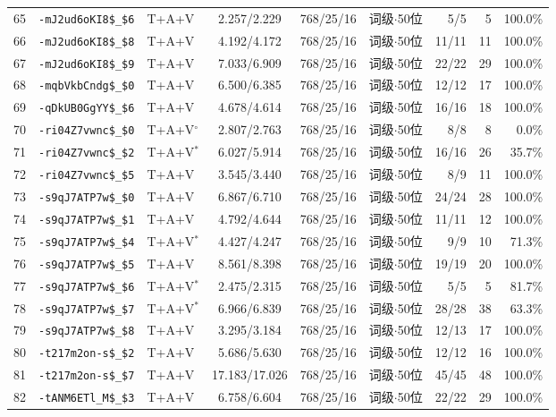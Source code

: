 \begin{longtable}{rllcccrrr}
65 & \texttt{-mJ2ud6oKI8\$\_\$6} & T+A+V & 2.257/2.229 & 768/25/16 & 词级$\cdot$50位 & 5/5 & 5 & 100.0\% \\
66 & \texttt{-mJ2ud6oKI8\$\_\$8} & T+A+V & 4.192/4.172 & 768/25/16 & 词级$\cdot$50位 & 11/11 & 11 & 100.0\% \\
67 & \texttt{-mJ2ud6oKI8\$\_\$9} & T+A+V & 7.033/6.909 & 768/25/16 & 词级$\cdot$50位 & 22/22 & 29 & 100.0\% \\
68 & \texttt{-mqbVkbCndg\$\_\$0} & T+A+V & 6.500/6.385 & 768/25/16 & 词级$\cdot$50位 & 12/12 & 17 & 100.0\% \\
69 & \texttt{-qDkUB0GgYY\$\_\$6} & T+A+V & 4.678/4.614 & 768/25/16 & 词级$\cdot$50位 & 16/16 & 18 & 100.0\% \\
70 & \texttt{-ri04Z7vwnc\$\_\$0} & T+A+V$^{\circ}$ & 2.807/2.763 & 768/25/16 & 词级$\cdot$50位 & 8/8 & 8 & 0.0\% \\
71 & \texttt{-ri04Z7vwnc\$\_\$2} & T+A+V$^{*}$ & 6.027/5.914 & 768/25/16 & 词级$\cdot$50位 & 16/16 & 26 & 35.7\% \\
72 & \texttt{-ri04Z7vwnc\$\_\$5} & T+A+V & 3.545/3.440 & 768/25/16 & 词级$\cdot$50位 & 8/9 & 11 & 100.0\% \\
73 & \texttt{-s9qJ7ATP7w\$\_\$0} & T+A+V & 6.867/6.710 & 768/25/16 & 词级$\cdot$50位 & 24/24 & 28 & 100.0\% \\
74 & \texttt{-s9qJ7ATP7w\$\_\$1} & T+A+V & 4.792/4.644 & 768/25/16 & 词级$\cdot$50位 & 11/11 & 12 & 100.0\% \\
75 & \texttt{-s9qJ7ATP7w\$\_\$4} & T+A+V$^{*}$ & 4.427/4.247 & 768/25/16 & 词级$\cdot$50位 & 9/9 & 10 & 71.3\% \\
76 & \texttt{-s9qJ7ATP7w\$\_\$5} & T+A+V & 8.561/8.398 & 768/25/16 & 词级$\cdot$50位 & 19/19 & 20 & 100.0\% \\
77 & \texttt{-s9qJ7ATP7w\$\_\$6} & T+A+V$^{*}$ & 2.475/2.315 & 768/25/16 & 词级$\cdot$50位 & 5/5 & 5 & 81.7\% \\
78 & \texttt{-s9qJ7ATP7w\$\_\$7} & T+A+V$^{*}$ & 6.966/6.839 & 768/25/16 & 词级$\cdot$50位 & 28/28 & 38 & 63.3\% \\
79 & \texttt{-s9qJ7ATP7w\$\_\$8} & T+A+V & 3.295/3.184 & 768/25/16 & 词级$\cdot$50位 & 12/13 & 17 & 100.0\% \\
80 & \texttt{-t217m2on-s\$\_\$2} & T+A+V & 5.686/5.630 & 768/25/16 & 词级$\cdot$50位 & 12/12 & 16 & 100.0\% \\
81 & \texttt{-t217m2on-s\$\_\$7} & T+A+V & 17.183/17.026 & 768/25/16 & 词级$\cdot$50位 & 45/45 & 48 & 100.0\% \\
82 & \texttt{-tANM6ETl\_M\$\_\$3} & T+A+V & 6.758/6.604 & 768/25/16 & 词级$\cdot$50位 & 22/22 & 29 & 100.0\% \\

\end{longtable}
